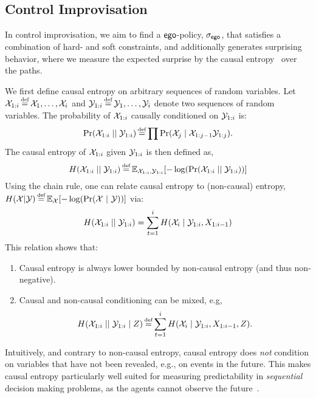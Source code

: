 {{{

\subsection{Control Improvisation}
In control improvisation, we aim to find a $\mathsf{ego}$-policy,
${\sigma_{\mathsf{ego}}}$, that satisfies a combination of hard- and soft
constraints, and additionally generates surprising behavior, where we
measure the expected surprise by the causal
entropy~\cite{DirectedInfoTheoery} over the paths. 

We first define causal entropy on arbitrary sequences of random variables.
Let $\rv{X}_{1:i} \eqdef \rv{X}_1, \hdots, \rv{X}_i$ and $\rv{Y}_{1:i} \eqdef
\rv{Y}_1,\hdots,\rv{Y}_i$ denote two sequences of random variables. The
probability of $ {\mathcal{X}}_{1:i}$ causally conditioned on ${\mathcal{Y}}_{1:i}$ is:
\begin{equation}
  \causalprob{\rv{X}_{1:i}}{\rv{Y}_{1:i}} \eqdef \prod \Pr(\rv{X}_j \mid \rv{X}_{1:j-1}\rv{Y}_{1:j}).
\end{equation}
The causal entropy of ${\mathcal{X}}_{1:i}$ given ${\mathcal{Y}}_{1:i}$ is then defined as,
\begin{equation}
  H(\rv{X}_{1:i}\mid\mid \rv{Y}_{1:i}) \eqdef \expOver{\rv{X}_{1:i},\rv{Y}_{1:i}}{-\log(\causalprob{\rv{X}_{1:i}}{\rv{Y}_{1:i}})}
\end{equation}
Using the chain rule, one can relate causal entropy to (non-causal) entropy, $H(\rv{X} | \rv{Y}) \eqdef \expOver{\rv{X}}{-\log(\Pr(\rv{X}~|~\rv{Y}))}$ via:
\begin{equation}
  H({\mathcal{X}}_{1:i}\mid\mid {\mathcal{Y}}_{1:i}) = \sum_{t=1}^i H({\mathcal{X}}_i \mid {\mathcal{Y}}_{1:i}, X_{1:i-1})
\end{equation}
This relation shows that:
\begin{enumerate}
  \item Causal entropy is always lower bounded by non-causal
    entropy (and thus non-negative).
  \item Causal and non-causal conditioning can be mixed, e.g,
    \begin{equation}
      H(\rv{X}_{1:i}\mid\mid \rv{Y}_{1:i} \mid Z) \eqdef \sum_{t=1}^i H(\rv{X}_i \mid \rv{Y}_{1:i}, X_{1:i-1}, Z).
    \end{equation}
\end{enumerate}
Intuitively, and contrary to non-causal entropy, causal entropy does \emph{not}
condition on variables that have not been revealed, e.g., on events in the future. 
This makes causal entropy particularly well suited for measuring
predictability in \emph{sequential} decision making problems, as the 
agents cannot observe the future~\cite{mceThesis}.

}}}
